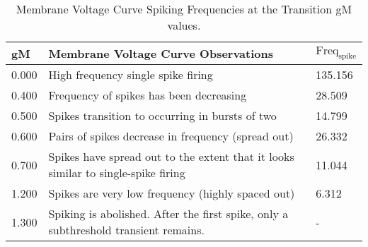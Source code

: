 \documentclass[12pt]{article}
\begin{document}
\begin{table}[H]                                                                         
\centering                                                                            
\begin{tabular}{|l|l|l|}                                                              
\hline                                                                                
gM & Membrane Voltage Curve Observations & $\text{Freq}_{\text{spike}}$ \\                                           
\hline                                                                                
0.000 & High frequency single spike firing & 135.156 \\                                                          
\hline                                                                                
0.400 & Frequency of spikes has been decreasing & 28.509 \\                                                           
\hline                                                                                
0.500 & Spikes transition to occurring in bursts of two & 14.799 \\
\hline                                                                                
0.600 & Pairs of spikes decrease in frequency (spread out) & 26.332 \\
\hline
0.700 & Spikes have spread out to the extent that it looks similar to single-spike firing & 11.044 \\
\hline                                                                                
1.200 & Spikes are very low frequency (highly spaced out) & 6.312 \\                                                            
\hline                                                                                
1.300 & Spiking is abolished. After the first spike, only a subthreshold transient remains. & - \\                                                                
\hline                                                                                
\end{tabular}                                                                         
\caption{Membrane Voltage Curve Spiking Frequencies at the Transition gM values.}
\label{table:2a3}                                                                 
\end{table}                                                                           
\end{document}
